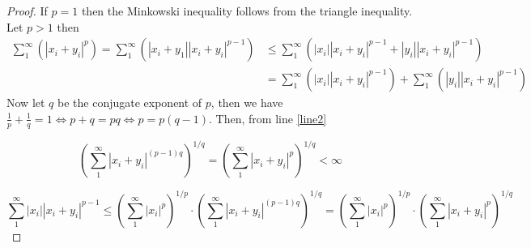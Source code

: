 \begin{proof}
    If $p=1$ then the Minkowski inequality follows from the
    triangle inequality. Let $p>1$ then
    \begin{align}\sum_{1}^{\infty}{\left(|x_{i} + y_{i}|^p\right)}=
    \sum_{1}^{\infty}{\left(|x_i+y_1||x_{i} + y_{i}|^{p-1}\right)}
    &\leq\sum_{1}^{\infty}{\left(|x_i||x_{i} + y_{i}|^{p-1}
    +|y_i||x_{i} + y_{i}|^{p-1}\right)}\\
    &=\sum_{1}^{\infty}{\left(|x_i||x_{i} + y_{i}|^{p-1}\right)}
    +\sum_{1}^{\infty}{\left(|y_i||x_{i} + y_{i}|^{p-1}\right)}
    \label{line2}
    \end{align}
    Now let $q$ be the conjugate exponent of $p$, then we have
    $\frac{1}{p}+\frac{1}{q}=1 \iff p+q=pq \iff p=p(q-1)$. Then,
    from line
    \ref{line2}

    $$\left(\sum_{1}^{\infty}{|x_i+y_i|^{(p-1)q}}\right)^{1/q}
    =\left(\sum_{1}^{\infty}{|x_i+y_i|^{p}}\right)^{1/q}
    <\infty$$

    $$\sum_{1}^{\infty}{|x_i||x_{i} + y_{i}|^{p-1}}
    \leq \left(\sum_{1}^{\infty}{|x_i|^p}\right)^{1/p}\cdot
    \left(\sum_{1}^{\infty}{|x_i+y_i|^{(p-1)q}}\right)^{1/q}
    =\left(\sum_{1}^{\infty}{|x_i|^p}\right)^{1/p}\cdot
    \left(\sum_{1}^{\infty}{|x_i+y_i|^{p}}\right)^{1/q}$$
\end{proof}